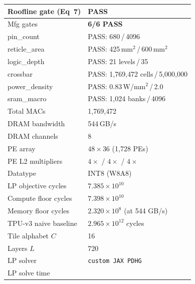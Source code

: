 \begin{table}[h]
\begin{tabular}{@{}ll@{}}
Roofline gate (Eq~7)    & \textcolor{green!60!black}{\textbf{PASS}} \\
\midrule
Mfg gates               & \textcolor{green!60!black}{\textbf{6/6 PASS}} \\
\quad pin\_count         & PASS: 680\,/\,4096 \\
\quad reticle\_area      & PASS: 425\,mm$^2$\,/\,600\,mm$^2$ \\
\quad logic\_depth       & PASS: 21 levels\,/\,35 \\
\quad crossbar           & PASS: 1{,}769{,}472 cells\,/\,5{,}000{,}000 \\
\quad power\_density     & PASS: 0.83\,W/mm$^2$\,/\,2.0 \\
\quad sram\_macro        & PASS: 1{,}024 banks\,/\,4096 \\
\midrule
Total MACs              & 1{,}769{,}472 \\
DRAM bandwidth          & 544\,GB/s \\
DRAM channels           & 8 \\
PE array                & $48 \times 36$ (1{,}728 PEs) \\
PE L2 multipliers       & $4\times$ / $4\times$ / $4\times$ \\
Datatype                & INT8 (W8A8) \\
LP objective cycles     & $7.385 \times 10^{10}$ \\
Compute floor cycles    & $7.398 \times 10^{10}$ \\
Memory floor cycles     & $2.320 \times 10^{8}$ (at 544 GB/s) \\
TPU-v3 naive baseline   & $2.965 \times 10^{12}$ cycles \\
Tile alphabet $C$       & 16 \\
Layers $L$              & 720 \\
LP solver               & \texttt{custom JAX PDHG} \\
LP solve time           &  \\
\bottomrule
\end{tabular}
\end{table}


